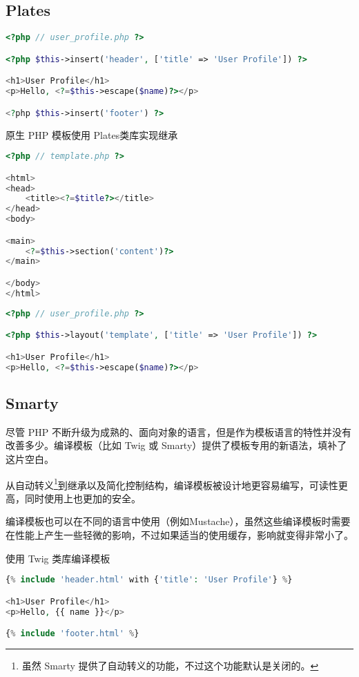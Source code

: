 \subsection{Plates}

\begin{lstlisting}[language=PHP]
<?php // user_profile.php ?>

<?php $this->insert('header', ['title' => 'User Profile']) ?>

<h1>User Profile</h1>
<p>Hello, <?=$this->escape($name)?></p>

<?php $this->insert('footer') ?>
\end{lstlisting}

\begin{example}
原生 PHP 模板使用 Plates类库实现继承
\begin{lstlisting}[language=PHP]
<?php // template.php ?>

<html>
<head>
    <title><?=$title?></title>
</head>
<body>

<main>
    <?=$this->section('content')?>
</main>

</body>
</html>
\end{lstlisting}
\end{example}

\begin{lstlisting}[language=PHP]
<?php // user_profile.php ?>

<?php $this->layout('template', ['title' => 'User Profile']) ?>

<h1>User Profile</h1>
<p>Hello, <?=$this->escape($name)?></p>
\end{lstlisting}

\subsection{Smarty}


尽管 PHP 不断升级为成熟的、面向对象的语言，但是作为模板语言的特性并没有改善多少。编译模板（比如 Twig 或 Smarty）提供了模板专用的新语法，填补了这片空白。

从自动转义\footnote{虽然 Smarty 提供了自动转义的功能，不过这个功能默认是关闭的。}到继承以及简化控制结构，编译模板被设计地更容易编写，可读性更高，同时使用上也更加的安全。

编译模板也可以在不同的语言中使用（例如Mustache），虽然这些编译模板时需要在性能上产生一些轻微的影响，不过如果适当的使用缓存，影响就变得非常小了。

\begin{example}
使用 Twig 类库编译模板
\begin{lstlisting}[language=PHP]
{% include 'header.html' with {'title': 'User Profile'} %}

<h1>User Profile</h1>
<p>Hello, {{ name }}</p>

{% include 'footer.html' %}
\end{lstlisting}
\end{example}

